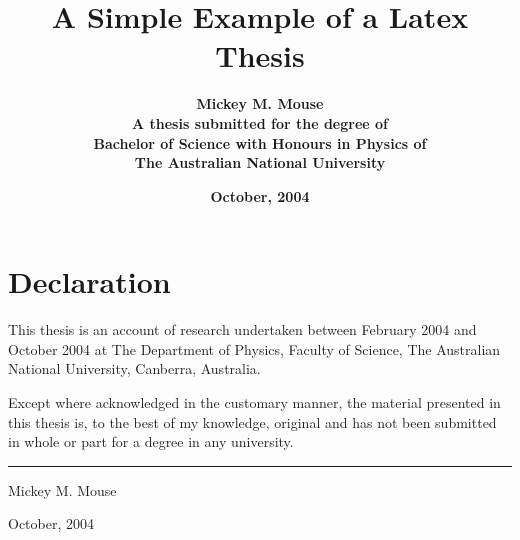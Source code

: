 \documentclass[twoside,onecolumn,11pt,a4paper]{book}
\begin{document}

\begin{titlepage}
\title{\textbf{A Simple Example of a Latex Thesis}\\[2cm]}
 \author{\textbf{Mickey M. Mouse}\\[6cm]
 \textbf{A thesis submitted for the degree of}\\
 \textbf{Bachelor of Science with Honours in Physics of} \\
 \textbf{The Australian National University}\\[1cm]}
 \date{\textbf{October, 2004}}
\maketitle
 \end{titlepage}
 
 \sloppy
 
\chapter*{Declaration}

This thesis is an account of research undertaken between February 2004 and 
October 2004 at The Department of Physics, Faculty of Science, 
The Australian National University, Canberra, Australia.

Except where acknowledged in the customary manner, the material 
presented in this thesis is, to the best of my knowledge, original and 
has not been submitted in whole or part for a degree in any 
university.

\vspace{20mm}  %

\hspace{80mm}\rule{40mm}{.15mm}\par   %
\hspace{80mm} Mickey M. Mouse\par
\hspace{80mm} October, 2004




\tableofcontents
\listoffigures %

\setcounter{page}{1}  %



\end{document}
